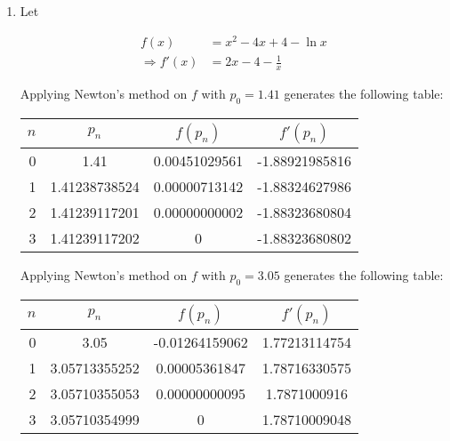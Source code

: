 \documentclass[../../../../Assignments]{subfiles}
\begin{document}
\begin{solution}
    \begin{enumerate}[label = \alph*)]
        \item Let

            \begin{align*}
                            f(x) &= x^2 - 4x + 4 - \ln{x} \\
                \Rightarrow f'(x) &= 2x - 4 - \frac{1}{x}
            \end{align*}

            Applying Newton's method on \(f\) with \(p_0 = \num{1.41}\)
            generates the following table:

            \begin{table}[H]
                \centering
                \begin{tabular}{r S[table-format=1.11] S[table-format=1.11] S[table-format=-1.11]}
                    \toprule
                    \(n\)  &    {\(p_n\)}    &   {\(f(p_n)\)}  &  {\(f'(p_n)\)}  \\
                      &  1.41           &  0.00451029561  &  -1.88921985816  \\
                        1  &  1.41238738524  &  0.00000713142  &  -1.88324627986  \\
                        2  &  1.41239117201  &  0.00000000002  &  -1.88323680804  \\
                        3  &  1.41239117202  &  0              &  -1.88323680802  \\
                    \bottomrule
                \end{tabular}
            \end{table}

            Applying Newton's method on \(f\) with \(p_0 = \num{3.05}\)
            generates the following table:

            \begin{table}[H]
                \centering
                \begin{tabular}{r S[table-format=1.11] S[table-format=-1.11] S[table-format=1.11]}
                    \toprule
                    \(n\)  &    {\(p_n\)}    &   {\(f(p_n)\)}   &  {\(f'(p_n)\)}  \\
                      &  3.05           &  -0.01264159062  &  1.77213114754  \\
                        1  &  3.05713355252  &   0.00005361847  &  1.78716330575  \\
                        2  &  3.05710355053  &   0.00000000095  &  1.7871000916   \\
                        3  &  3.05710354999  &   0              &  1.78710009048  \\
                    \bottomrule
                \end{tabular}
            \end{table}


\end{enumerate}
\end{solution}
\end{document}
